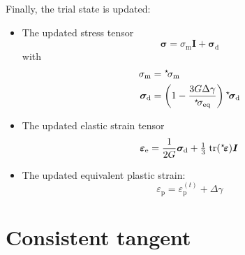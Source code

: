 \documentclass[times]{goose-article}
\newcommand\leftstar[1]{\hspace*{-.3em}~^\star\!#1}
\begin{document}
Finally, the trial state is updated:
\begin{itemize}
\item The updated stress tensor
\begin{equation}
  \bm{\sigma}
    = \sigma_\mathrm{m} \bm{I}
    + \bm{\sigma}_\mathrm{d}
\end{equation}
with
\begin{align}
  \sigma_\mathrm{m}
    &= \leftstar{\sigma}_\mathrm{m}
  \\
  \bm{\sigma}_\mathrm{d}
    &= \left(
         1 - \frac{3 G \Delta \gamma}{\leftstar{\sigma}_\mathrm{eq}}
       \right) \leftstar{\bm{\sigma}}_\mathrm{d}
\end{align}
\item The updated elastic strain tensor
\begin{equation}
  \bm{\varepsilon}_\mathrm{e}
    = \frac{1}{2G} \bm{\sigma}_\mathrm{d}
    + \tfrac{1}{3} \;\mathrm{tr} (\leftstar{\bm{\varepsilon}}) \bm{I}
\end{equation}
\item The updated equivalent plastic strain:
\begin{equation}
  \varepsilon_\mathrm{p}
    = \varepsilon_\mathrm{p}^{(t)}
    + \Delta \gamma
\end{equation}
\end{itemize}

\section{Consistent tangent}
\end{document}
